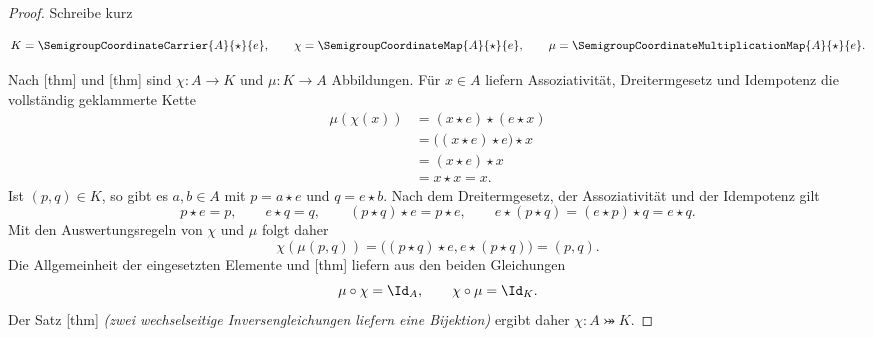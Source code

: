 \documentclass[main.tex]{subfiles}
\begin{document}
\begin{proof}
Schreibe kurz

\[
 K=\SemigroupCoordinateCarrier{A}{\star}{e},\qquad
 \chi=\SemigroupCoordinateMap{A}{\star}{e},\qquad
 \mu=\SemigroupCoordinateMultiplicationMap{A}{\star}{e}.
\]

Nach
[thm] und
[thm]
sind \(\chi\colon A\to K\) und \(\mu\colon K\to A\) Abbildungen.  F\"ur
\(x\in A\) liefern Assoziativit\"at, Dreitermgesetz und Idempotenz die
vollst\"andig geklammerte Kette
\[
\begin{aligned}
 \mu(\chi(x))
 &=(x\star e)\star(e\star x)\\
 &=\bigl((x\star e)\star e\bigr)\star x\\
 &=(x\star e)\star x\\
 &=x\star x=x.
\end{aligned}
\]
Ist \((p,q)\in K\), so gibt es \(a,b\in A\) mit
\(p=a\star e\) und \(q=e\star b\).  Nach dem Dreitermgesetz,
der Assoziativit\"at und der Idempotenz gilt
\[
 p\star e=p,\qquad e\star q=q,\qquad
 (p\star q)\star e=p\star e,
 \qquad e\star(p\star q)=(e\star p)\star q=e\star q.
\]
Mit den Auswertungsregeln von \(\chi\) und \(\mu\) folgt daher
\[
 \chi(\mu(p,q))
 =\bigl((p\star q)\star e,e\star(p\star q)\bigr)
 =(p,q).
\]
Die Allgemeinheit der eingesetzten Elemente und
[thm] liefern aus den beiden
Gleichungen
\[
 \mu\circ\chi=\Id_A,
 \qquad
 \chi\circ\mu=\Id_K.
\]
Der Satz
[thm]
\emph{(zwei wechselseitige Inversengleichungen liefern eine
Bijektion)} ergibt daher \(\chi\colon A\bij K\).


\end{proof}
\end{document}
